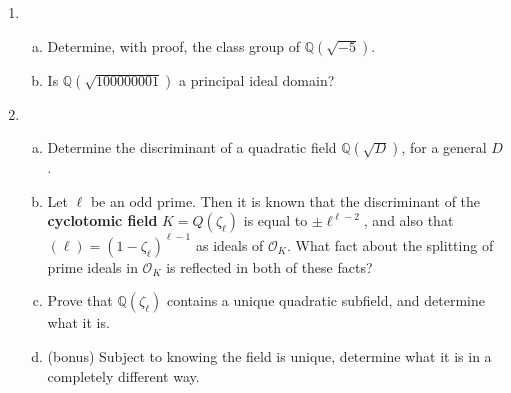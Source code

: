 \documentclass[12pt]{amsart}
\begin{document}
\begin{enumerate}[1.]
\vskip 0.5cm
\item

\begin{enumerate}[(a)]
\item Determine, with proof, the class group of $\mathbb{Q}(\sqrt{-5})$.
\item Is $\mathbb{Q}(\sqrt{100000001})$ a principal ideal domain?
\end{enumerate}
\vskip 0.5cm
\item
\begin{enumerate}[(a)]
\item
Determine the discriminant of a quadratic field $\mathbb{Q}(\sqrt{D})$, for a general $D$.
\item
Let $\ell$ be an odd prime. Then it is known that the discriminant of the {\bf cyclotomic field}
$K = Q(\zeta_{\ell})$ is equal to $\pm \ell^{\ell - 2}$, and also that $(\ell) = (1 - \zeta_{\ell})^{\ell - 1}$
as ideals of $\mathcal{O}_K$.
What fact about the splitting of prime ideals in $\mathcal{O}_K$ is reflected in both of these facts?
\item
Prove that $\mathbb{Q}(\zeta_{\ell})$ contains a unique quadratic subfield, and determine what it is.
\item
(bonus) Subject to knowing the field is unique, determine what it is in a completely different way.
\end{enumerate}
\end{enumerate}
\end{document}
